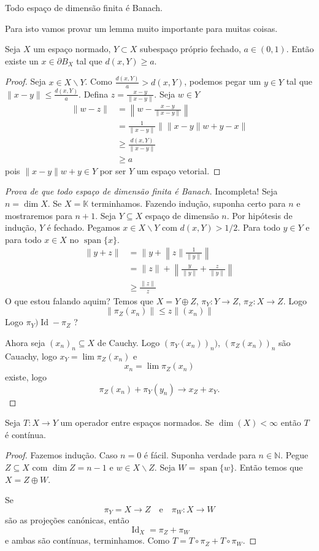 \documentclass[portuguese]{article}
\theoremstyle{definition}
\newcommand{\N}{\mathbb{N}}
\DeclareMathOperator{\Id}{Id}
\begin{document}
	\begin{teo}
		Todo espaço de dimensão finita é Banach.
	\end{teo}
	Para isto vamos provar um lemma muito importante para muitas coisas.
	\begin{lema}[Riesz]
		Seja $X$ um espaço normado, $Y\subset X$ subespaço próprio fechado, $a\in(0,1)$. Então existe un $x\in\partial B_X$ tal que $d(x,Y)\geq a$.
	\end{lema}
	\begin{proof}
		Seja $x\in X\backslash Y$. Como $\frac{d(x,Y)}{a}>d(x,Y)$, podemos pegar um $y\in Y$ tal que $\| x-y\|\leq\frac{d(x,Y)}{a}$. Defina $z=\frac{x-y}{\| x-y\|}$. Seja $w\in Y$
		\begin{align*}
			\| w-z\|&=\left\| w-\frac{x-y}{\| x-y\|}\right\|\\
			&=\frac{1}{\| x-y\|}\left\|\| x-y\| w+y-x\right\|\\
			&\geq \frac{d(x,Y)}{\| x-y\|}\\
			&\geq a
		\end{align*}
		pois $\| x-y\| w+y\in Y$ por ser $Y$ um espaço vetorial.
	\end{proof}
	\begin{proof}[Prova de que todo espaço de dimensão finita é Banach] {\color{orange} Incompleta!} 
		Seja $n=\dim X$. Se $X=\mathbb{K}$ terminhamos. Fazendo indução, suponha certo para $n$ e mostraremos para $n+1$. Seja $Y\subseteq X$ espaço de dimensão $n$. Por hipótesis de indução, $Y$ é fechado. Pegamos $x\in X\backslash Y$ com $d(x,Y)>1/2$. Para todo $y\in Y$ e para todo $x\in X$ no $\operatorname{span}\{x\}$.
		\begin{align*}
			\| y+z\|&=\| y+\left\| z\|\frac{1}{\| y\|}\right\|\\
			&=\| z\|+\left\|\frac{y}{\| y\|}+\frac{z}{\| y\|}\right\|\\
			&\geq\frac{\| z\|}{z}
		\end{align*}
		O que estou falando aquim? Temos que $X=Y\oplus Z$, $\pi_Y:Y\to Z$, $\pi_Z:X\to Z$. Logo
		\[\| \pi_Z(x_n)\| \leq z\| (x_n)\|\]
		Logo $\pi_Y)\Id-\pi_Z$ ?
		
		Ahora seja $(x_n)_n\subseteq X$ de Cauchy. Logo $(\pi_Y(x_n))_n)$, $(\pi_Z(x_n))_n$ são Cauachy, logo $x_Y=\lim \pi_Z(x_n)$ e
		\[x_n=\lim\pi_Z(x_n)\]
		existe, logo
		\[\pi_Z(x_n)+\pi_Y(y_n)\to x_Z+x_Y.\]
	\end{proof}
	
	\begin{prop}
		Seja $T:X\to Y$ um operador entre espaços normados. Se $\dim(X)<\infty$ então $T$ é contínua.
	\end{prop}
	\begin{proof}
		Fazemos indução. Caso $n=0$ é fácil. Suponha verdade para $n\in\N$. Pegue $Z\subseteq X$ com $\dim Z=n-1$ e $w\in X\backslash Z$. Seja $W=\operatorname{span}\{w\}$. Então temos que $X=Z\oplus W$.
		
		Se 
		\[\pi_Y=X\to Z\quad \text{e}\quad \pi_W:X\to W\]
		são as projeções canónicas, então
		\[\Id_{X}=\pi_Z+\pi_W\]
		e ambas são contínuas, terminhamos. Como $T=T\circ \pi_Z+T\circ\pi_W$.
	\end{proof}
	
\end{document}
